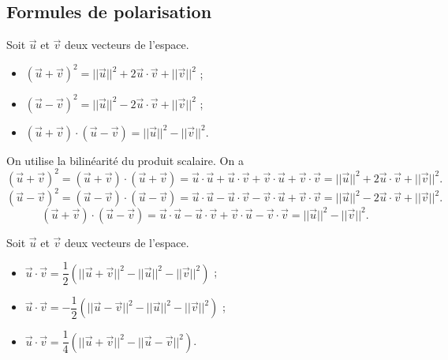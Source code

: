 \documentclass[11pt,fleqn, openany]{book} %
\begin{document}
\subsection{Formules de polarisation}

\begin{proposition}Soit $\vec u$ et $\vec v$ deux vecteurs de l'espace.
\begin{itemize}
\item $(\vec{u}+\vec{v})^2=\lvert\lvert\vec{u}\rvert\rvert^2+2\vec{u}\cdot\vec{v}+\lvert\lvert\vec{v}\rvert\rvert^2$ ;
\item $(\vec{u}-\vec{v})^2=\lvert\lvert\vec{u}\rvert\rvert^2-2\vec{u}\cdot\vec{v}+\lvert\lvert\vec{v}\rvert\rvert^2$ ;
\item $(\vec{u}+\vec{v})\cdot (\vec{u}-\vec{v})=\lvert\lvert\vec{u}\rvert\rvert^2-\lvert\lvert\vec{v}\rvert\rvert^2$.
\end{itemize}\end{proposition}

\begin{demonstration} On utilise la bilinéarité du produit scalaire. On a\[(\vec{u}+\vec{v})^2 =  (\vec{u}+\vec{v}) \cdot (\vec{u}+\vec{v})= \vec{u}\cdot\vec{u}+\vec{u}\cdot \vec{v}+\vec{v}\cdot\vec{u}+\vec{v}\cdot \vec{v}=\lvert\lvert\vec{u}\rvert\rvert^2+2\vec{u}\cdot\vec{v}+\lvert\lvert\vec{v}\rvert\rvert^2.\]
\[(\vec{u}-\vec{v})^2 =  (\vec{u}-\vec{v}) \cdot (\vec{u}-\vec{v})= \vec{u}\cdot\vec{u}-\vec{u}\cdot \vec{v}-\vec{v}\cdot\vec{u}+\vec{v}\cdot \vec{v}=\lvert\lvert\vec{u}\rvert\rvert^2-2\vec{u}\cdot\vec{v}+\lvert\lvert\vec{v}\rvert\rvert^2.\]
\[(\vec{u}+\vec{v})\cdot (\vec{u}-\vec{v})= \vec{u}\cdot\vec{u}-\vec{u}\cdot \vec{v}+\vec{v}\cdot\vec{u}-\vec{v}\cdot \vec{v}=\lvert\lvert\vec{u}\rvert\rvert^2-\lvert\lvert\vec{v}\rvert\rvert^2.\]
\end{demonstration}

\begin{proposition}Soit $\vec{u}$ et $\vec{v}$ deux vecteurs de l'espace.
\begin{itemize}
\item $\vec{u} \cdot \vec{v}= \dfrac{1}{2}(\lvert\lvert\vec{u}+\vec{v}\rvert\rvert^2-\lvert\lvert\vec{u}\rvert\rvert^2-\lvert\lvert\vec{v}\rvert\rvert^2)$ ;
\item $\vec{u} \cdot \vec{v}= -\dfrac{1}{2}(\lvert\lvert\vec{u}-\vec{v}\rvert\rvert^2-\lvert\lvert\vec{u}\rvert\rvert^2-\lvert\lvert\vec{v}\rvert\rvert^2)$ ;
\item $\vec{u} \cdot \vec{v} = \dfrac{1}{4}( \lvert\lvert\vec{u}+\vec{v}\rvert\rvert^2-\lvert\lvert\vec{u}-\vec{v}\rvert\rvert^2 )$.
\end{itemize}\end{proposition}
\end{document}
